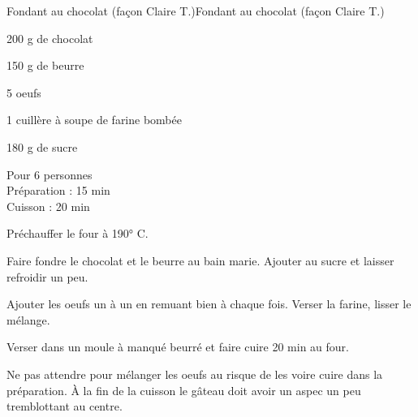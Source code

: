 \begin{recette}{Fondant au chocolat (façon Claire T.)}{Fondant au chocolat (façon Claire T.)}

\begin{ingredients}
200 g de chocolat\par
150 g de beurre\par
5 oeufs\par
1 cuillère à soupe de farine bombée\par
180 g de sucre\par
\end{ingredients}

\begin{infos}
Pour 6 personnes\\
Préparation : 15 min\\
Cuisson : 20 min\\
\end{infos}

\begin{etapes}
\item Préchauffer le four à 190° C.
\item Faire fondre le chocolat et le beurre au bain marie. Ajouter au sucre et laisser refroidir un peu.
\item Ajouter les oeufs un à un en remuant bien à chaque fois. Verser la farine, lisser le mélange.
\item Verser dans un moule à manqué beurré et faire cuire 20 min au four.
\end{etapes}

\begin{conseils}
Ne pas attendre pour mélanger les oeufs au risque de les voire cuire dans la préparation.
À la fin de la cuisson le gâteau doit avoir un aspec un peu tremblottant au centre.
\end{conseils}

\end{recette}